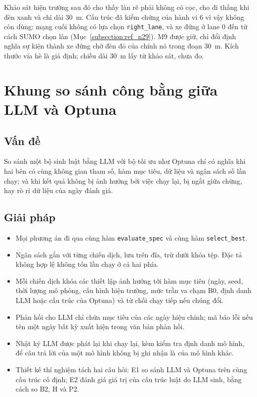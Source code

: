 \documentclass[../DoAn.tex]{subfiles}
\begin{document}
Khảo sát hiện trường sau đó cho thấy làn rẽ phải không có cọc, cho đi thẳng khi đèn xanh và chỉ dài 30~m. Cấu trúc đã kiểm chứng của hành vi 6 vì vậy không còn dùng: mạng cuối không có lựa chọn \texttt{right\_lane}, và xe đứng ở lane 0 đến từ cách SUMO chọn làn (Mục~\ref{subsection:ref_n29}). M9 được giữ, chỉ đổi định nghĩa sự kiện thành xe đứng chờ đèn đỏ của chính nó trong đoạn 30~m. Kích thước vỉa hè là giả định; chiều dài 30~m lấy từ khảo sát, chưa đo.

\section{Khung so sánh công bằng giữa LLM và Optuna}
\label{section:5.7}

\subsection{Vấn đề}

So sánh một bộ sinh luật bằng LLM với bộ tối ưu như Optuna chỉ có nghĩa khi hai bên có cùng không gian tham số, hàm mục tiêu, dữ liệu và ngân sách số lần chạy; và khi kết quả không bị ảnh hưởng bởi việc chạy lại, bị ngắt giữa chừng, hay rò rỉ dữ liệu của ngày đánh giá.

\subsection{Giải pháp}

\begin{itemize}
    \item Mọi phương án đi qua cùng hàm \texttt{evaluate\_spec} và cùng hàm \texttt{select\_best}.
    \item Ngân sách gắn với từng chiến dịch, lưu trên đĩa, trừ dưới khóa tệp. Đặc tả không hợp lệ không tốn lần chạy ở cả hai phía.
    \item Mỗi chiến dịch khóa các thiết lập ảnh hưởng tới hàm mục tiêu (ngày, seed, thời lượng mô phỏng, cấu hình hiện trường, mức trần va chạm B0, định danh LLM hoặc cấu trúc của Optuna) và từ chối chạy tiếp nếu chúng đổi.
    \item Phản hồi cho LLM chỉ chứa mục tiêu của các ngày hiệu chỉnh; mã báo lỗi nếu tên một ngày bất kỳ xuất hiện trong văn bản phản hồi.
    \item Nhật ký LLM được phát lại khi chạy lại, kèm kiểm tra định danh mô hình, để câu trả lời của một mô hình không bị ghi nhận là của mô hình khác.
    \item Thiết kế thí nghiệm tách hai câu hỏi: E1 so sánh LLM và Optuna trên cùng cấu trúc cố định; E2 đánh giá giá trị của cấu trúc luật do LLM sinh, bằng cách so B2, H và P2.
\end{itemize}
\end{document}
